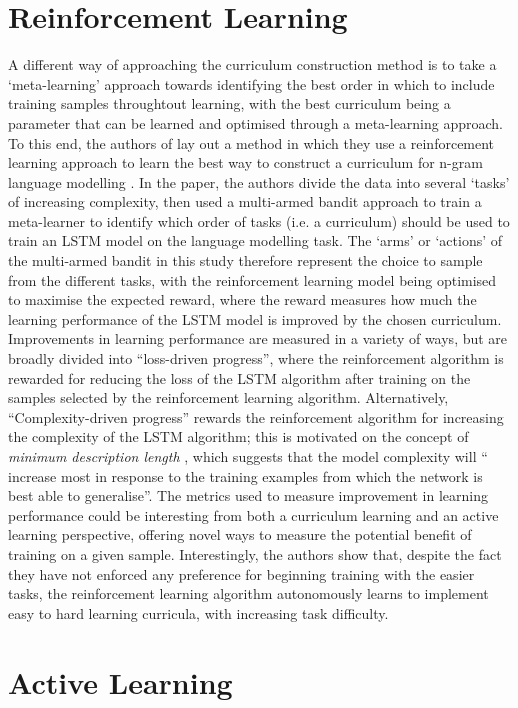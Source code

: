 \section{Reinforcement Learning}
A different way of approaching the curriculum construction method is to take a `meta-learning' \cite{vilalta2002perspective} approach towards identifying the best order in which to include training samples throughtout learning, with the best curriculum being a parameter that can be learned and optimised through a meta-learning approach. To this end, the authors of \cite{graves2017automated} lay out a method in which they use a reinforcement learning \cite{sutton1998introduction} approach to learn the best way to construct a curriculum for n-gram language modelling \cite{kneser1995improved}. In the paper, the authors divide the data into several `tasks' of increasing complexity, then used a multi-armed bandit approach \cite{sutton1998introduction} to train a meta-learner to identify which order of tasks (i.e. a curriculum) should be used to train an LSTM model on the language modelling task. The `arms' or `actions' of the multi-armed bandit in this study therefore represent the choice to sample from the different tasks, with the reinforcement learning model being optimised to maximise the expected reward, where the reward measures how much the learning performance of the LSTM model is improved by the chosen curriculum. Improvements in learning performance are measured in a variety of ways, but are broadly divided into ``loss-driven progress'', where the reinforcement algorithm is rewarded for reducing the loss of the LSTM algorithm after training on the samples selected by the reinforcement learning algorithm. Alternatively, ``Complexity-driven progress'' rewards the reinforcement algorithm for increasing the complexity of the LSTM algorithm; this is motivated on the concept of \textit{minimum description length} \cite{grunwaldminimum}, which suggests that the model complexity will `` increase most in response to the training examples from which the network is best able to generalise''. The metrics used to measure improvement in learning performance could be interesting from both a curriculum learning and an active learning perspective, offering novel ways to measure the potential benefit of training on a given sample. Interestingly, the authors show that, despite the fact they have not enforced any preference for beginning training with the easier tasks, the reinforcement learning algorithm autonomously learns to implement easy to hard learning curricula, with increasing task difficulty. 



\section{Active Learning}